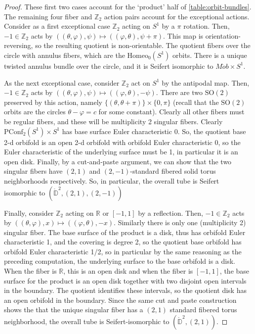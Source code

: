 \documentclass[10pt, oneside]{article}
\newcommand{\R}{\mathbb{R}}
\newcommand{\Z}{\mathbb{Z}}
\newcommand{\SO}[1][2]{\text{SO}(#1)}
\newcommand{\homeo}[1][S^1]{\text{Homeo}_0(#1)}
\newcommand{\pconf}[2][S^1]{\text{PConf}_{#2}(#1)}
\theoremstyle{definition}
\theoremstyle{definition}
\begin{document}
\begin{proof}
    These first two cases account for the `product' half of \cref{table:orbit-bundles}. The remaining four fiber and $\Z_2$ action pairs account for the exceptional actions. Consider as a first exceptional case $\Z_2$ acting on $S^1$ by a $\pi$ rotation. Then, $-1\in\Z_2$ acts by $((\theta, \varphi), \psi) \mapsto ((\varphi, \theta), \psi + \pi)$. This map is orientation-reversing, so the resulting quotient is non-orientable. The quotient fibers over the circle with annulus fibers, which are the $\homeo$ orbits. There is a unique twisted annulus bundle over the circle, and it is Seifert isomorphic to $M\ddot{o}b \times S^1$.

    As the next exceptional case, consider $\Z_2$ act on $S^1$ by the antipodal map. Then, $-1\in\Z_2$ acts by $((\theta, \varphi), \psi)\mapsto ((\varphi, \theta), -\psi)$. There are two $\SO$ preserved by this action, namely $\{(\theta, \theta + \pi)\}\times \{0, \pi\}$ (recall that the $\SO$ orbits are the circles $\theta-\varphi = c$ for some constant). Clearly all other fibers must be regular fibers, and these will be multiplicity 2 singular fibers. Clearly $\pconf{2}\times S^1$ has base surface Euler characteristic 0. So, the quotient base 2-d orbifold is an open 2-d orbifold with orbifold Euler characteristic 0, so the Euler characteristic of the underlying surface must be 1, in particular it is an open disk. Finally, by a cut-and-paste argument, we can show that the two singular fibers have $(2, 1)$ and $(2,-1)$-standard fibered solid torus neighborhoods respectively. So, in particular, the overall tube is Seifert isomorphic to $(\mathring{\mathbb{D}}^2, (2, 1), (2,-1))$

    Finally, consider $\Z_2$ acting on $\R$ or $[-1, 1]$ by a reflection. Then, $-1\in\Z_2$ acts by $((\theta, \varphi), x)\mapsto ((\varphi, \theta), -x)$. Similarly there is only one (multiplicity 2) singular fiber. The base surface of the product is a disk, thus has orbifold Euler characteristic 1, and the covering is degree 2, so the quotient base orbifold has orbifold Euler characteristic 1/2, so in particular by the same reasoning as the preceding computation, the underlying surface to the base orbifold is a disk. When the fiber is $\R$, this is an open disk and when the fiber is $[-1,1]$, the base surface for the product is an open disk together with two disjoint open intervals in the boundary. The quotient identifies these intervals, so the quotient disk has an open orbifold in the boundary. Since the same cut and paste construction shows the that the unique singular fiber has a $(2,1)$ standard fibered torus neighborhood, the overall tube is Seifert-isomorphic to $(\mathring{\mathbb{D}}^2, (2, 1))$.
\end{proof}
\end{document}

